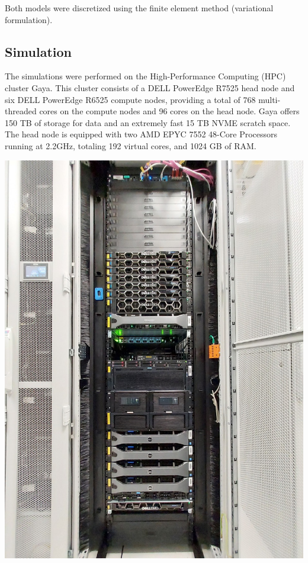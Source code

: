 \documentclass[12pt]{article}
\begin{document}
Both models were discretized using the finite element method (variational formulation).

\subsection{Simulation}
\begin{minipage}[t]{0.49\textwidth}
\raggedright
The simulations were performed on the High-Performance Computing (HPC) cluster Gaya. 
This cluster consists of a DELL PowerEdge R7525 head node and six DELL PowerEdge 
R6525 compute nodes, providing a total of 768 multi-threaded cores on the compute 
nodes and 96 cores on the head node. Gaya offers 150 TB of storage for data and 
an extremely fast 15 TB NVME scratch space. The head node is equipped with two AMD EPYC 7552 48-Core Processors running at 
2.2GHz, totaling 192 virtual cores, and 1024 GB of RAM. 
\end{minipage}
\hfill
\begin{minipage}[t]{0.49\textwidth}
\raggedleft
\includegraphics[width=1.1\textwidth, angle=-90]{images/gaya.jpeg}
\end{minipage}
\end{document}
